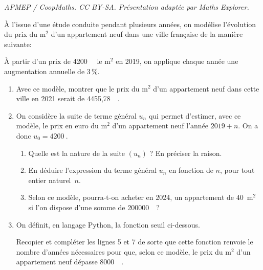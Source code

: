 \documentclass[10pt]{article}
\providecommand{\euro}{\texteuro}
\providecommand{\np}[2][]{{#2~#1}}
\providecommand{\euro}{{\text{€}}}
\renewcommand{\euro}{\ifmmode\text{\texteuro}\else\texteuro\fi}
\begin{document}
\noindent\textit{APMEP / CoopMaths. CC BY-SA. Présentation adaptée par Maths Explorer.}\par\medskip
\medskip
 
À l'issue d'une étude conduite pendant plusieurs années, on modélise l'évolution du prix du m$^2$ d'un appartement neuf dans une ville française de la manière suivante:

À partir d'un prix de \np{4200}~\euro{} le m$^2$ en 2019, on applique chaque année une augmentation annuelle de 3\,\%.

\medskip

\begin{enumerate}
\item Avec ce modèle, montrer que le prix du m$^2$ d'un appartement neuf dans cette ville en 2021 serait de \np{4455,78}~\euro.
\item  On considère la suite de terme général $u_n$ qui permet d'estimer, avec ce modèle, le prix en euro du m$^2$ d'un appartement neuf l'année $2019 + n$. On a donc $u_0 = \np{4200}$.
	\begin{enumerate}
		\item Quelle est la nature de la suite $\left(u_n\right)$ ? En préciser la raison.
		\item En déduire l'expression du terme général $u_n$ en fonction de $n$, pour tout entier naturel~$n$.
		\item Selon ce modèle, pourra-t-on acheter en 2024, un appartement de $40$~m$^2$ si l'on dispose d'une somme de \np{200000}~\euro ?
	\end{enumerate}
\item  On définit, en langage Python, la fonction seuil ci-dessous.

\begin{center}
\end{center}
 
Recopier et compléter les lignes 5 et 7 de sorte que cette fonction renvoie le nombre d'années nécessaires pour que, selon ce modèle, le prix du m$^2$ d'un appartement neuf dépasse \np{8000}~\euro.

\end{enumerate}

\bigskip
\end{document}
